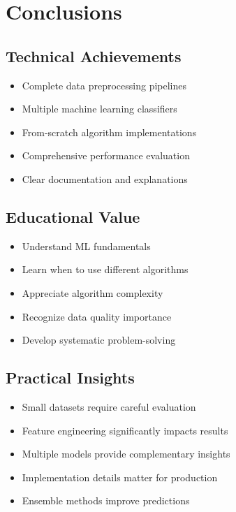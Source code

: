 \documentclass[14pt,a4paper]{report}
\begin{document}
\section{Conclusions}

\subsection{Technical Achievements}

\begin{itemize}
    \item[\checkmark] Complete data preprocessing pipelines
    \item[\checkmark] Multiple machine learning classifiers
    \item[\checkmark] From-scratch algorithm implementations
    \item[\checkmark] Comprehensive performance evaluation
    \item[\checkmark] Clear documentation and explanations
\end{itemize}

\subsection{Educational Value}

\begin{itemize}
    \item[\checkmark] Understand ML fundamentals
    \item[\checkmark] Learn when to use different algorithms
    \item[\checkmark] Appreciate algorithm complexity
    \item[\checkmark] Recognize data quality importance
    \item[\checkmark] Develop systematic problem-solving
\end{itemize}

\subsection{Practical Insights}

\begin{itemize}
    \item[\checkmark] Small datasets require careful evaluation
    \item[\checkmark] Feature engineering significantly impacts results
    \item[\checkmark] Multiple models provide complementary insights
    \item[\checkmark] Implementation details matter for production
    \item[\checkmark] Ensemble methods improve predictions
\end{itemize}
\end{document}
